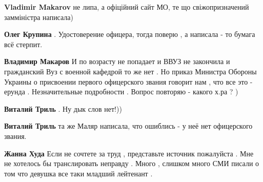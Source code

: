 \begin{itemize}
\begin{itemize}
\textbf{Vladimir Makarov} не липа, а офіційний сайт МО, те що свіжопризначений замміністра написала)

 
\textbf{Олег Крупина} . Удостоверение офицера, тогда поверю , а написала - то бумага всё стерпит.

 
\textbf{Владимир Макаров} И по возрасту не попадает и ВВУЗ не закончила и гражданский Вуз с военной кафедрой то же нет . Но приказ Министра Обороны Украины о присвоении первого офицерского звания говорит нам , что все это - ерунда . Незначительные подробности . Вопрос повторяю - какого х.ра ? )

 
\textbf{Виталий Триль} . Ну дык слов нет!))

 
\textbf{Виталий Триль} та же Маляр написала, что ошиблись - у неё нет офицерского звания.

 
\textbf{Жанна Худа} Если не сочтете за труд , представьте источник пожалуйста . Мне не хотелось бы транслировать неправду . Много , слишком много СМИ писали о том что девушка все таки младший лейтенант .

 

\end{itemize}
\end{itemize}
